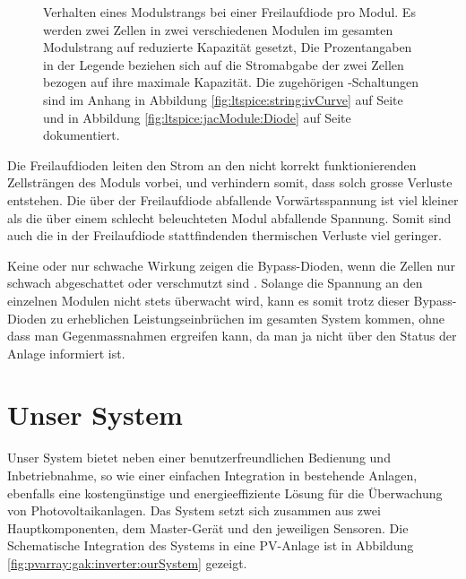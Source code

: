 \begin{figure}[h!tb]
    \centering
    
    \caption[%
        IV- und PV-Kurven eines Modulsstrangs bei Leistungseinbruch,
        mit Freilaufdioden%
    ]
    {
        Verhalten   eines    Modulstrangs   bei   einer    Freilaufdiode   pro
        Modul. Es    werden     zwei    Zellen    in     zwei    verschiedenen
        Modulen   im   gesamten   Modulstrang   auf   reduzierte   Kapazit\"at
        gesetzt,   Die   Prozentangaben   in   der   Legende   beziehen   sich
        auf   die    Stromabgabe   der   zwei   Zellen    bezogen   auf   ihre
        maximale  Kapazit\"at. Die   zugeh\"origen  -Schaltungen
        sind   im   Anhang   in   Abbildung   \ref{fig:ltspice:string:ivCurve}
        auf     Seite      \pageref{fig:ltspice:string:ivCurve}     und     in
        Abbildung       \ref{fig:ltspice:jacModule:Diode}      auf       Seite
        \pageref{fig:ltspice:jacModule:Diode} dokumentiert.%
    }
    \label{fig:simu:iv-curves:array:generic:bypass}
\end{figure}

Die  Freilaufdioden leiten  den Strom  an den  nicht korrekt  funktionierenden
Zellstr\"angen  des Moduls  vorbei, und  verhindern somit,  dass solch  grosse
Verluste entstehen. Die \"uber der Freilaufdiode abfallende Vorw\"artsspannung
ist viel kleiner  als die \"uber einem schlecht  beleuchteten Modul abfallende
Spannung.  Somit sind auch die in der Freilaufdiode stattfindenden thermischen
Verluste viel geringer.

Keine  oder nur  schwache Wirkung  zeigen die  Bypass-Dioden, wenn  die Zellen
nur schwach  abgeschattet oder  verschmutzt sind  . Solange die
Spannung an den einzelnen Modulen nicht  stets \"uberwacht wird, kann es somit
trotz dieser  Bypass-Dioden zu  erheblichen Leistungseinbr\"uchen  im gesamten
System kommen, ohne  dass man Gegenmassnahmen ergreifen kann, da  man ja nicht
\"uber den Status der Anlage informiert ist.


\clearpage
\section{Unser System}
\label{sec:ourSystem}

Unser   System  bietet   neben   einer   benutzerfreundlichen  Bedienung   und
Inbetriebnahme,  so wie  einer  einfachen Integration  in bestehende  Anlagen,
ebenfalls  eine  kosteng\"unstige  und energieeffiziente  L\"osung  f\"ur  die
\"Uberwachung  von Photovoltaikanlagen. Das  System  setzt  sich zusammen  aus
zwei  Hauptkomponenten, dem  Master-Ger\"at und  den jeweiligen  Sensoren. Die
Schematische  Integration  des Systems  in  eine  PV-Anlage ist  in  Abbildung
\ref{fig:pvarray:gak:inverter:ourSystem} gezeigt.

